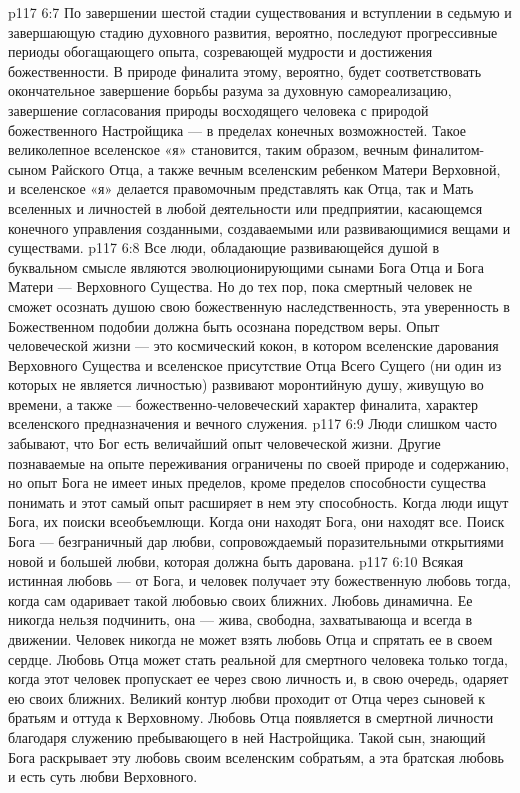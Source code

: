 \vs p117 6:7 По завершении шестой стадии существования и вступлении в седьмую и завершающую стадию духовного развития, вероятно, последуют прогрессивные периоды обогащающего опыта, созревающей мудрости и достижения божественности. В природе финалита этому, вероятно, будет соответствовать окончательное завершение борьбы разума за духовную самореализацию, завершение согласования природы восходящего человека с природой божественного Настройщика --- в пределах конечных возможностей. Такое великолепное вселенское «я» становится, таким образом, вечным финалитом\hyp{}сыном Райского Отца, а также вечным вселенским ребенком Матери Верховной, и вселенское «я» делается правомочным представлять как Отца, так и Мать вселенных и личностей в любой деятельности или предприятии, касающемся конечного управления созданными, создаваемыми или развивающимися вещами и существами.
\vs p117 6:8 Все люди, обладающие развивающейся душой в буквальном смысле являются эволюционирующими сынами Бога Отца и Бога Матери --- Верховного Существа. Но до тех пор, пока смертный человек не сможет осознать душою свою божественную наследственность, эта уверенность в Божественном подобии должна быть осознана поредством веры. Опыт человеческой жизни --- это космический кокон, в котором вселенские дарования Верховного Существа и вселенское присутствие Отца Всего Сущего (ни один из которых не является личностью) развивают моронтийную душу, живущую во времени, а также --- божественно\hyp{}человеческий характер финалита, характер вселенского предназначения и вечного служения.
\vs p117 6:9 \pc Люди слишком часто забывают, что Бог есть величайший опыт человеческой жизни. Другие познаваемые на опыте переживания ограничены по своей природе и содержанию, но опыт Бога не имеет иных пределов, кроме пределов способности существа понимать и этот самый опыт расширяет в нем эту способность. Когда люди ищут Бога, их поиски всеобъемлющи. Когда они находят Бога, они находят все. Поиск Бога --- безграничный дар любви, сопровождаемый поразительными открытиями новой и большей любви, которая должна быть дарована.
\vs p117 6:10 Всякая истинная любовь --- от Бога, и человек получает эту божественную любовь тогда, когда сам одаривает такой любовью своих ближних. Любовь динамична. Ее никогда нельзя подчинить, она --- жива, свободна, захватывающа и всегда в движении. Человек никогда не может взять любовь Отца и спрятать ее в своем сердце. Любовь Отца может стать реальной для смертного человека только тогда, когда этот человек пропускает ее через свою личность и, в свою очередь, одаряет ею своих ближних. Великий контур любви проходит от Отца через сыновей к братьям и оттуда к Верховному. Любовь Отца появляется в смертной личности благодаря служению пребывающего в ней Настройщика. Такой сын, знающий Бога раскрывает эту любовь своим вселенским собратьям, а эта братская любовь и есть суть любви Верховного.
